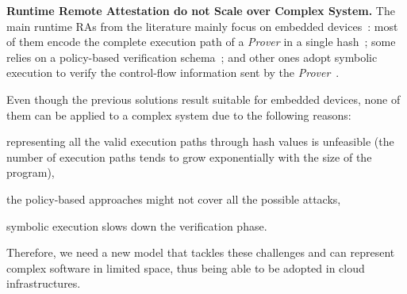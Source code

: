 \vspace{0.5cm}
\noindent \textbf{Runtime Remote Attestation do not Scale over Complex System.}
The main runtime RAs from the literature mainly focus on embedded 
devices~\citep{abera2016c,zeitouni2017atrium,aberadiat,dessouky2017fat,Dessouky:2018:LLH:3240765.3240821}:
most of them encode the complete execution path of a \emph{Prover} in a single 
hash~\citep{abera2016c,zeitouni2017atrium,dessouky2017fat}; 
some relies on a policy-based verification schema~\citep{aberadiat}; and
other ones adopt symbolic execution to verify the control-flow information 
sent by the \emph{Prover}~\citep{Dessouky:2018:LLH:3240765.3240821}.

Even though the previous solutions result suitable for embedded devices, none 
of them can be applied to a complex system due to the following reasons: 
\begin{enumerate*}[label=(\roman*)]
	\item representing all the valid execution paths through hash values is 
	unfeasible (\eg the number of execution paths tends to grow exponentially 
	with the size of the program),
	\item the policy-based approaches might not cover all the possible attacks,
	\item symbolic execution slows down the verification phase.
\end{enumerate*}
Therefore, we need a new model that tackles these challenges and can represent 
complex software in limited space, thus being able to be adopted in cloud 
infrastructures. 

